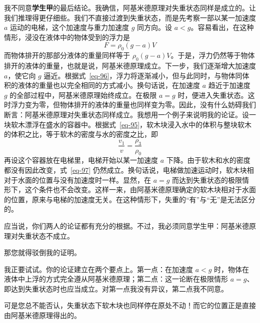 \begin{dialogue}
\stdb 我不同意\textbf{学生甲}的最后结论。我确信，阿基米德原理对失重状态同样是成立的。让我们推理得更仔细些。我们不直接过渡到失重状态，而是先考察一部以某一加速度 $a$ 运动的电梯，这个加速度与重力加速度 $g$ 同方向。设 $a<g$。容易看出，在这种情形，浸没在液体中的物体受到的浮力是
\begin{equation}%
F= \rho_{0} (g-a)V
\label{eq-96}
\end{equation}
而物体排开的那部分液体的重量同样等于 $\rho_{0} (g-a)V$。于是，浮力仍然等于物体排开的液体的重量，也就是说，阿基米德原理成立。下一步，我们逐渐增大加速度 $a$，使它向 $g$ 逼近。根据式~\eqref{eq-96}，浮力将逐渐减小，但与此同时，与物体同体积的液体的重量也以完全相同的方式减小。换句话说，在加速度 $a$ 趋近于加速度 $g$ 的全部过程中，阿基米德原理始终成立。在极限 $a=g$ 时，便进入失重状态。这时浮力变为零，但物体排开的液体的重量也同样变为零。因此，没有什么妨碍我们断言：阿基米德原理对失重状态同样成立。我想用一个例子来说明我的论证。设一块软木漂浮在盛水的容器中。根据式~\eqref{eq-95}，软木块浸入水中的体积与整块软木的体积之比，等于软木的密度与水的密度之比，即
\begin{equation}%
\frac{v_{1}}{v} = \frac{\rho_{3}}{\rho_{0}}
\label{eq-97}
\end{equation}
再设这个容器放在电梯里，电梯开始以某一加速度 $a$ 下降。由于软木和水的密度都没有因此改变，式~\eqref{eq-97} 仍然成立。换句话说，电梯做加速运动时，软木块相对于水面的位置与没有加速度时一样。显然，在 $a=g$ 而达到失重状态的极限情形下，这个条件也不会改变。这样一来，由阿基米德原理确定的软木块相对于水面的位置，原来与电梯的加速度无关。在这种情形下，失重的“有”与“无”是无法区分的。

\tchr 应当说，你们两人的论证都有充分的根据。不过，我必须同意学生甲：阿基米德原理对失重状态不成立。

\stdb 那您就得驳倒我的证明。

\tchr 我正要试试。你的论证建立在两个要点上。第一点：在加速度 $a<g$ 时，物体在液体中上浮的方式完全遵从阿基米德原理；第二点：这一论断在极限情形 $a=g$、即达到失重状态时也应当成立。对第一点我没有异议，第二点我不同意。

\stdb 可是您总不能否认，失重状态下软木块也同样停在原处不动！而它的位置正是直接由阿基米德原理得出的。


\end{dialogue}

